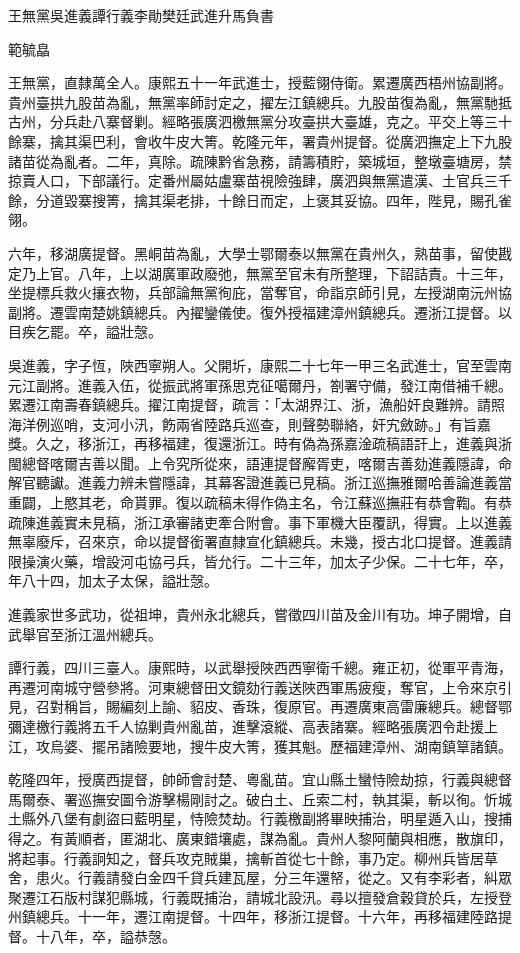 
\begin{pinyinscope}
王無黨吳進義譚行義李勛樊廷武進升馬負書

範毓皛

王無黨，直隸萬全人。康熙五十一年武進士，授藍翎侍衛。累遷廣西梧州協副將。貴州臺拱九股苗為亂，無黨率師討定之，擢左江鎮總兵。九股苗復為亂，無黨馳抵古州，分兵赴八寨督剿。經略張廣泗檄無黨分攻臺拱大臺雄，克之。平交上等三十餘寨，擒其渠巴利，會收牛皮大箐。乾隆元年，署貴州提督。從廣泗撫定上下九股諸苗從為亂者。二年，真除。疏陳黔省急務，請籌積貯，築城垣，整墩臺塘房，禁掠賣人口，下部議行。定番州屬姑盧寨苗視險強肆，廣泗與無黨遣漢、土官兵三千餘，分道毀寨搜箐，擒其渠老排，十餘日而定，上褒其妥協。四年，陛見，賜孔雀翎。

六年，移湖廣提督。黑峒苗為亂，大學士鄂爾泰以無黨在貴州久，熟苗事，留使戡定乃上官。八年，上以湖廣軍政廢弛，無黨至官未有所整理，下詔詰責。十三年，坐提標兵救火攘衣物，兵部論無黨徇庇，當奪官，命詣京師引見，左授湖南沅州協副將。遷雲南楚姚鎮總兵。內擢鑾儀使。復外授福建漳州鎮總兵。遷浙江提督。以目疾乞罷。卒，謚壯愨。

吳進義，字子恆，陜西寧朔人。父開圻，康熙二十七年一甲三名武進士，官至雲南元江副將。進義入伍，從振武將軍孫思克征噶爾丹，劄署守備，發江南借補千總。累遷江南壽春鎮總兵。擢江南提督，疏言：「太湖界江、浙，漁船奸良難辨。請照海洋例巡哨，支河小汛，飭兩省陸路兵巡查，則聲勢聯絡，奸宄斂跡。」有旨嘉獎。久之，移浙江，再移福建，復還浙江。時有偽為孫嘉淦疏稿語訐上，進義與浙閩總督喀爾吉善以聞。上令究所從來，語連提督廨胥吏，喀爾吉善劾進義隱諱，命解官聽讞。進義力辨未嘗隱諱，其幕客證進義已見稿。浙江巡撫雅爾哈善論進義當重闢，上愍其老，命貰罪。復以疏稿未得作偽主名，令江蘇巡撫莊有恭會鞫。有恭疏陳進義實未見稿，浙江承審諸吏牽合附會。事下軍機大臣覆訊，得實。上以進義無辜廢斥，召來京，命以提督銜署直隸宣化鎮總兵。未幾，授古北口提督。進義請限操演火藥，增設河屯協弓兵，皆允行。二十三年，加太子少保。二十七年，卒，年八十四，加太子太保，謚壯愨。

進義家世多武功，從祖坤，貴州永北總兵，嘗徵四川苗及金川有功。坤子開增，自武舉官至浙江溫州總兵。

譚行義，四川三臺人。康熙時，以武舉授陜西西寧衛千總。雍正初，從軍平青海，再遷河南城守營參將。河東總督田文鏡劾行義送陜西軍馬疲瘦，奪官，上令來京引見，召對稱旨，賜編刻上諭、貂皮、香珠，復原官。再遷廣東高雷廉總兵。總督鄂彌達檄行義將五千人協剿貴州亂苗，進擊滾縱、高表諸寨。經略張廣泗令赴援上江，攻烏婆、擺吊諸險要地，搜牛皮大箐，獲其魁。歷福建漳州、湖南鎮筸諸鎮。

乾隆四年，授廣西提督，帥師會討楚、粵亂苗。宜山縣土蠻恃險劫掠，行義與總督馬爾泰、署巡撫安圖令游擊楊剛討之。破白土、丘索二村，執其渠，斬以徇。忻城土縣外八堡有劇盜曰藍明星，恃險焚劫。行義檄副將畢映捕治，明星遁入山，搜捕得之。有黃順者，匿湖北、廣東錯壤處，謀為亂。貴州人黎阿蘭與相應，散旗印，將起事。行義詗知之，督兵攻克賊巢，擒斬首從七十餘，事乃定。柳州兵皆居草舍，患火。行義請發白金四千貸兵建瓦屋，分三年還帑，從之。又有李彩者，糾眾聚遷江石版村謀犯縣城，行義既捕治，請城北設汛。尋以擅發倉穀貸於兵，左授登州鎮總兵。十一年，遷江南提督。十四年，移浙江提督。十六年，再移福建陸路提督。十八年，卒，謚恭愨。


\end{pinyinscope}
